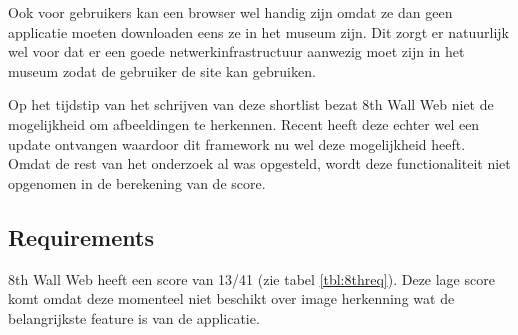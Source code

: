 Ook voor gebruikers kan een browser wel handig zijn omdat ze dan geen applicatie moeten downloaden eens ze in het museum zijn. Dit zorgt er natuurlijk wel voor dat er een goede netwerkinfrastructuur aanwezig moet zijn in het museum zodat de gebruiker de site kan gebruiken.

Op het tijdstip van het schrijven van deze shortlist bezat 8th Wall Web niet de mogelijkheid om afbeeldingen te herkennen. Recent heeft deze echter wel een update ontvangen waardoor dit framework nu wel deze mogelijkheid heeft. Omdat de rest van het onderzoek al was opgesteld, wordt deze functionaliteit niet opgenomen in de berekening van de score.

\subsection{Requirements}
8th Wall Web heeft een score van 13/41 (zie tabel \ref{tbl:8threq}). Deze lage score komt omdat deze momenteel niet beschikt over image herkenning wat de belangrijkste feature is van de applicatie.
